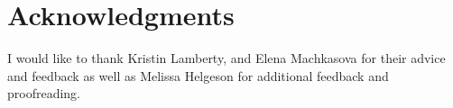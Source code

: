 \documentclass{sig-alternate}
\begin{document}
\section{Acknowledgments}
	I would like to thank Kristin Lamberty, and Elena Machkasova for their advice and feedback as well as Melissa Helgeson for additional feedback and proofreading. 




  


%
%
\end{document}
